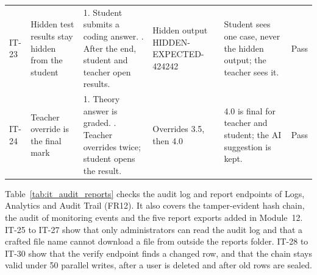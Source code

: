 {\begin{longtable}{@{}P{1.1cm}P{2.5cm}P{3.5cm}P{2.6cm}P{2.9cm}>{\centering\arraybackslash}p{1.8cm}@{}}
IT-23 & Hidden test results stay hidden from the student & 1. Student submits a coding answer. . After the end, student and teacher open results. & Hidden output HIDDEN-\allowbreak{}EXPECTED-\allowbreak{}424242  & Student sees one case, never the hidden output; the teacher sees it. & Pass\\
IT-24 & Teacher override is the final mark & 1. Theory answer is graded. . Teacher overrides twice; student opens the result. & Overrides 3.5, then 4.0  & 4.0 is final for teacher and student; the AI suggestion is kept. & Pass\\
\end{longtable}}

Table~\ref{tab:it_audit_reports} checks the audit log and report endpoints of Logs, Analytics and Audit Trail (FR12). It also covers the tamper-evident hash chain, the audit of monitoring events and the five report exports added in Module~12. IT-25 to IT-27 show that only administrators can read the audit log and that a crafted file name cannot download a file from outside the reports folder. IT-28 to IT-30 show that the verify endpoint finds a changed row, and that the chain stays valid under 50 parallel writes, after a user is deleted and after old rows are sealed.

